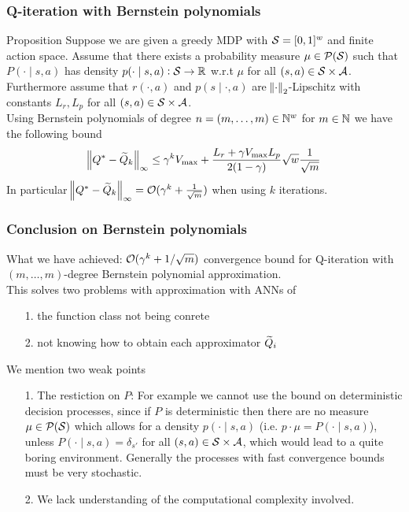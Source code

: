 \documentclass{beamer}[10]
\begin{document}
\begin{frame}
  \frametitle{Q-iteration with Bernstein polynomials}
  \begingroup
  \footnotesize
  \begin{block}{Proposition}
    Suppose we are given a greedy MDP with $\mathcal{S} = [0,1]^w$ and finite
    action space. Assume that there exists a probability measure
    $\mu \in \mathcal{P}(\mathcal{S})$ such that $P(\cdot \mid s, a)$ has density
    $p(\cdot \mid s, a) : \mathcal{S} \to \mathbb{R}$ w.r.t $\mu$ for all
    $(s, a) \in \mathcal{S} \times \mathcal{A}$. Furthermore assume that $r(\cdot, a)$
    and $p(s \mid \cdot, a)$ are $\norm{\cdot}_2$-Lipschitz with constants
    $L_r, L_p$ for all $(s, a) \in \mathcal{S} \times \mathcal{A}$.
    \\Using Bernstein polynomials of degree
    $n = (m, \dots, m) \in \mathbb{N}^w$ for $m \in \mathbb{N}$ we have the following bound
    \[ \norm{Q^* - \widetilde{Q}_k}_\infty \leq \gamma^{k} V_{\max}
      + \frac{L_r + \gamma V_{\max} L_p}{2(1-\gamma)} \sqrt{w}
    \frac{1}{\sqrt{m}} \]
    In particular $\norm{Q^* - \widetilde{Q}_k}_\infty
    = \mathcal{O}(\gamma^{k} + \frac{1}{\sqrt{m}})$
    when using $k$ iterations.
  \end{block} 
  \endgroup
\end{frame}

\begin{frame}
  \frametitle{Conclusion on Bernstein polynomials}
  \begingroup
  \footnotesize
  What we have achieved: $\mathcal{O}(\gamma^k + 1/\sqrt{m})$ convergence bound 
  for Q-iteration with $(m, \dots, m)$-degree Bernstein polynomial approximation.
  \\ This solves two problems with approximation with ANNs of
  \begin{itemize}
    \item[1.] the function class not being conrete
    \item[2.] not knowing
      how to obtain each approximator $\widetilde{Q}_i$
  \end{itemize}
  We mention two weak points
  \begin{itemize}
    \item[1.] The restiction on $P$:
      For example we cannot use the bound on deterministic
      decision processes, since if $P$ is deterministic then there
      are no measure $\mu \in \mathcal{P}(\mathcal{S})$ which allows for a
      density $p(\cdot \mid s, a)$ (i.e. $p \cdot \mu = P(\cdot \mid s, a)$),
      unless $P(\cdot \mid s, a) = \delta_{s'}$ for all $(s, a) \in \mathcal{S} \times
      \mathcal{A}$, which would lead to a quite boring environment.
      Generally the processes with fast convergence bounds must be very stochastic.
    \item[2.] We lack understanding of the computational complexity involved. 
  \end{itemize}
  \endgroup
\end{frame}
\end{document}
